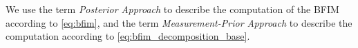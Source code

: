 
We use the term \emph{Posterior Approach} to describe the computation of the BFIM according to \eqref{eq:bfim}, and the term \emph{Measurement-Prior Approach} to describe the computation 
according to \eqref{eq:bfim_decomposition_base}.



